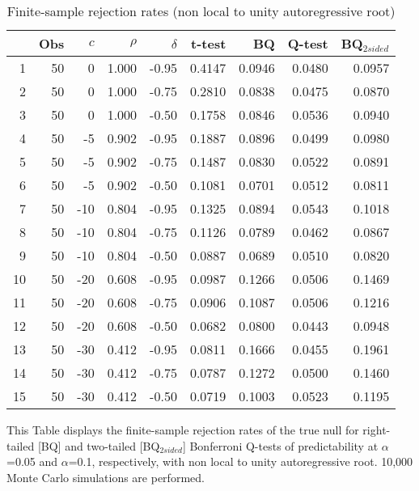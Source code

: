 \documentclass[11pt, a4paper]{article}
\begin{document}
\begin{table}[h!]
\caption{Finite-sample rejection rates (non local to unity autoregressive root) }
\label{tab:non-local}
\centering
\begin{threeparttable}
\begin{tabular}{rrrrrrrrr}
  \hline
 & Obs & $c$ & $\rho$ & $\delta$ & t-test & BQ & Q-test & BQ$_{{2sided}}$ \\ 
  \hline
1 & 50 & 0 & 1.000 & -0.95 & 0.4147 & 0.0946 & 0.0480 & 0.0957 \\ 
  2 & 50 & 0 & 1.000 & -0.75 & 0.2810 & 0.0838 & 0.0475 & 0.0870 \\ 
  3 & 50 & 0 & 1.000 & -0.50 & 0.1758 & 0.0846 & 0.0536 & 0.0940 \\ 
  4 & 50 & -5 & 0.902 & -0.95 & 0.1887 & 0.0896 & 0.0499 & 0.0980 \\ 
  5 & 50 & -5 & 0.902 & -0.75 & 0.1487 & 0.0830 & 0.0522 & 0.0891 \\ 
  6 & 50 & -5 & 0.902 & -0.50 & 0.1081 & 0.0701 & 0.0512 & 0.0811 \\ 
  7 & 50 & -10 & 0.804 & -0.95 & 0.1325 & 0.0894 & 0.0543 & 0.1018 \\ 
  8 & 50 & -10 & 0.804 & -0.75 & 0.1126 & 0.0789 & 0.0462 & 0.0867 \\ 
  9 & 50 & -10 & 0.804 & -0.50 & 0.0887 & 0.0689 & 0.0510 & 0.0820 \\ 
  10 & 50 & -20 & 0.608 & -0.95 & 0.0987 & 0.1266 & 0.0506 & 0.1469 \\ 
  11 & 50 & -20 & 0.608 & -0.75 & 0.0906 & 0.1087 & 0.0506 & 0.1216 \\ 
  12 & 50 & -20 & 0.608 & -0.50 & 0.0682 & 0.0800 & 0.0443 & 0.0948 \\ 
  13 & 50 & -30 & 0.412 & -0.95 & 0.0811 & 0.1666 & 0.0455 & 0.1961 \\ 
  14 & 50 & -30 & 0.412 & -0.75 & 0.0787 & 0.1272 & 0.0500 & 0.1460 \\ 
  15 & 50 & -30 & 0.412 & -0.50 & 0.0719 & 0.1003 & 0.0523 & 0.1195 \\ 
   \hline
\end{tabular}
 \begin{tablenotes}
 \small
\item This Table displays the finite-sample rejection rates of the true null for right-tailed  [BQ] and two-tailed  [BQ$_{{2sided}}$] Bonferroni Q-tests of predictability at $\alpha$=0.05 and $\alpha$=0.1, respectively, with non local to unity autoregressive root. 10,000 Monte Carlo simulations are performed.
\end{tablenotes}
\end{threeparttable}
\end{table}
\end{document}
